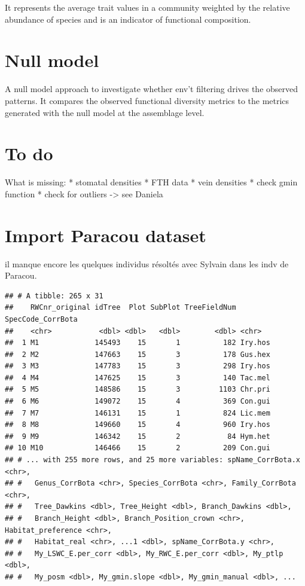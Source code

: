 \documentclass[
]{book}
\begin{document}
It represents the average trait values in a community weighted by the relative abundance of species and is an indicator of functional composition.

\hypertarget{null-model}{%
\chapter{Null model}\label{null-model}}

A null model approach to investigate whether env't filtering drives the observed patterns. It compares the observed functional diversity metrics to the metrics generated with the null model at the assemblage level.

\hypertarget{to-do}{%
\chapter{To do}\label{to-do}}

What is missing:
* stomatal densities
* FTH data
* vein densities
* check gmin function
* check for outliers -\textgreater{} see Daniela

\hypertarget{import-paracou-dataset}{%
\chapter{Import Paracou dataset}\label{import-paracou-dataset}}

il manque encore les quelques individus résoltés avec Sylvain dans les indv de Paracou.

\begin{verbatim}
## # A tibble: 265 x 31
##    RWCnr_original idTree  Plot SubPlot TreeFieldNum SpecCode_CorrBota
##    <chr>           <dbl> <dbl>   <dbl>        <dbl> <chr>            
##  1 M1             145493    15       1          182 Iry.hos          
##  2 M2             147663    15       3          178 Gus.hex          
##  3 M3             147783    15       3          298 Iry.hos          
##  4 M4             147625    15       3          140 Tac.mel          
##  5 M5             148586    15       3         1103 Chr.pri          
##  6 M6             149072    15       4          369 Con.gui          
##  7 M7             146131    15       1          824 Lic.mem          
##  8 M8             149660    15       4          960 Iry.hos          
##  9 M9             146342    15       2           84 Hym.het          
## 10 M10            146466    15       2          209 Con.gui          
## # ... with 255 more rows, and 25 more variables: spName_CorrBota.x <chr>,
## #   Genus_CorrBota <chr>, Species_CorrBota <chr>, Family_CorrBota <chr>,
## #   Tree_Dawkins <dbl>, Tree_Height <dbl>, Branch_Dawkins <dbl>,
## #   Branch_Height <dbl>, Branch_Position_crown <chr>, Habitat_preference <chr>,
## #   Habitat_real <chr>, ...1 <dbl>, spName_CorrBota.y <chr>,
## #   My_LSWC_E.per_corr <dbl>, My_RWC_E.per_corr <dbl>, My_ptlp <dbl>,
## #   My_posm <dbl>, My_gmin.slope <dbl>, My_gmin_manual <dbl>, ...
\end{verbatim}
\end{document}
